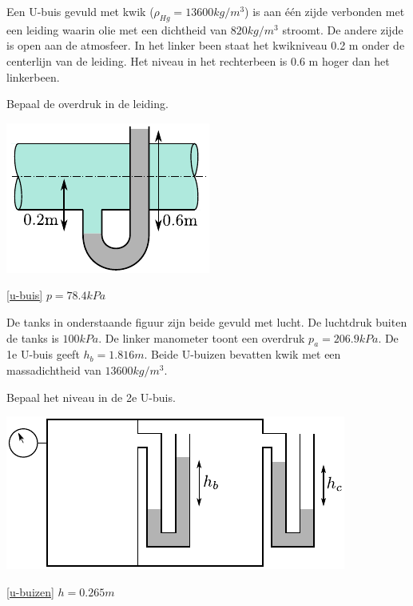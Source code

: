\begin{toepassing}
	\label{u-buis}
Een U-buis gevuld met kwik ($\rho_{Hg}=13600 \unit{kg/m^3}$) is aan één zijde verbonden met een leiding waarin olie met een dichtheid van $820 \unit{kg/m^3}$ stroomt. De andere zijde is open aan de atmosfeer. In het linker been staat het kwikniveau 0.2 m onder de centerlijn van de leiding. Het niveau in het rechterbeen is 0.6 m hoger dan het linkerbeen.
		
Bepaal de overdruk in de leiding.

	\centering
	\includegraphics{fig/hydrostatica/u-buis}
\end{toepassing}
\begin{antwoord}{\ref{u-buis}}
	$p = 78.4 \unit{kPa}$
\end{antwoord}
\begin{toepassing}
	\label{u-buizen}
De tanks in onderstaande figuur zijn beide gevuld met lucht. De luchtdruk buiten de tanks is $100 \unit{kPa}$. De linker manometer toont een overdruk $p_a=206.9 \unit{kPa}$. De 1e U-buis geeft $h_b=1.816 \unit{m}$. Beide U-buizen bevatten kwik met een massadichtheid van $13600 \unit{kg/m^3}$.
		
Bepaal het niveau in de 2e U-buis.

	\centering
	\includegraphics{fig/hydrostatica/u-buizen}
\end{toepassing}
\begin{antwoord}{\ref{u-buizen}}
	$h = 0.265 \unit{m}$
\end{antwoord}

